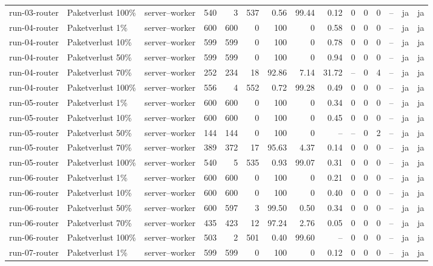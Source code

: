 \begin{table}
{\begin{tabular}{l l p{3.2cm} r r r r r r r r r r r r}
run-03-router & Paketverlust 100\% & server--worker & 540 & 3 & 537 & 0.56 & 99.44 & 0.12 & 0 & 0 & 0 & -- & ja & ja \\
run-04-router & Paketverlust 1\% & server--worker & 600 & 600 & 0 & 100 & 0 & 0.58 & 0 & 0 & 0 & -- & ja & ja \\
run-04-router & Paketverlust 10\% & server--worker & 599 & 599 & 0 & 100 & 0 & 0.78 & 0 & 0 & 0 & -- & ja & ja \\
run-04-router & Paketverlust 50\% & server--worker & 599 & 599 & 0 & 100 & 0 & 0.94 & 0 & 0 & 0 & -- & ja & ja \\
run-04-router & Paketverlust 70\% & server--worker & 252 & 234 & 18 & 92.86 & 7.14 & 31.72 & -- & 0 & 4 & -- & ja & ja \\
run-04-router & Paketverlust 100\% & server--worker & 556 & 4 & 552 & 0.72 & 99.28 & 0.49 & 0 & 0 & 0 & -- & ja & ja \\
run-05-router & Paketverlust 1\% & server--worker & 600 & 600 & 0 & 100 & 0 & 0.34 & 0 & 0 & 0 & -- & ja & ja \\
run-05-router & Paketverlust 10\% & server--worker & 600 & 600 & 0 & 100 & 0 & 0.45 & 0 & 0 & 0 & -- & ja & ja \\
run-05-router & Paketverlust 50\% & server--worker & 144 & 144 & 0 & 100 & 0 & -- & -- & 0 & 2 & -- & ja & ja \\
run-05-router & Paketverlust 70\% & server--worker & 389 & 372 & 17 & 95.63 & 4.37 & 0.14 & 0 & 0 & 0 & -- & ja & ja \\
run-05-router & Paketverlust 100\% & server--worker & 540 & 5 & 535 & 0.93 & 99.07 & 0.31 & 0 & 0 & 0 & -- & ja & ja \\
run-06-router & Paketverlust 1\% & server--worker & 600 & 600 & 0 & 100 & 0 & 0.21 & 0 & 0 & 0 & -- & ja & ja \\
run-06-router & Paketverlust 10\% & server--worker & 600 & 600 & 0 & 100 & 0 & 0.40 & 0 & 0 & 0 & -- & ja & ja \\
run-06-router & Paketverlust 50\% & server--worker & 600 & 597 & 3 & 99.50 & 0.50 & 0.34 & 0 & 0 & 0 & -- & ja & ja \\
run-06-router & Paketverlust 70\% & server--worker & 435 & 423 & 12 & 97.24 & 2.76 & 0.05 & 0 & 0 & 0 & -- & ja & ja \\
run-06-router & Paketverlust 100\% & server--worker & 503 & 2 & 501 & 0.40 & 99.60 & -- & 0 & 0 & 0 & -- & ja & ja \\
run-07-router & Paketverlust 1\% & server--worker & 599 & 599 & 0 & 100 & 0 & 0.12 & 0 & 0 & 0 & -- & ja & ja \\

\end{tabular}}
\end{table}
